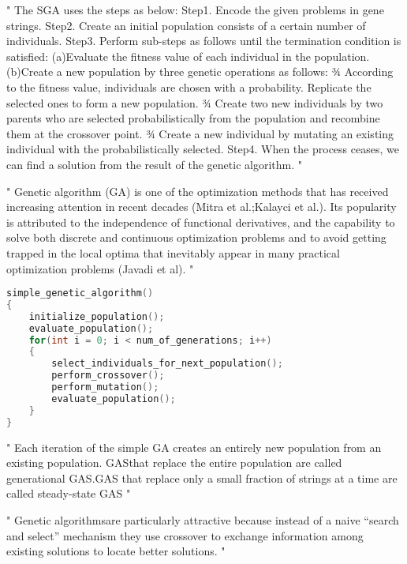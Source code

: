 "
The SGA uses the steps as below: Step1. Encode the given problems in gene strings. Step2. Create an initial population consists of a certain number of individuals. Step3. Perform sub-steps as follows until the termination condition is satisfied: (a)Evaluate the fitness value of each individual in the population. (b)Create a new population by three genetic operations as follows: ¾ According to the fitness value, individuals are chosen with a probability. Replicate the selected ones to form a new population. ¾ Create two new individuals by two parents who are selected probabilistically from the population and recombine them at the crossover point. ¾ Create a new individual by mutating an existing individual with the probabilistically selected. Step4. When the process ceases, we can find a solution from the result of the genetic algorithm.
"\cite{jinghui_zhong_comparison_2005}


"
Genetic algorithm (GA) is one of the optimization methods that has received increasing attention in recent decades (Mitra et al.;Kalayci et al.). Its popularity is attributed to the independence of functional derivatives, and the capability to solve both discrete and continuous optimization problems and to avoid getting trapped in the local optima that inevitably appear in many practical optimization problems (Javadi et al).
"


\begin{lstlisting}[language=C, tabsize=4]
simple_genetic_algorithm() 
{
	initialize_population();
	evaluate_population();
	for(int i = 0; i < num_of_generations; i++) 
	{
		select_individuals_for_next_population();
		perform_crossover();
		perform_mutation();
		evaluate_population();
	}
}
\end{lstlisting}
\cite{srinivas_genetic_1994}


"
Each iteration of the simple GA creates an entirely new population from an existing population. GASthat replace the entire population are called generational GAS.GAS that replace only a small fraction of strings at a time are called steady-state GAS
"\cite{srinivas_genetic_1994}

"
Genetic algorithmsare particularly attractive because instead of a naive “search and select” mechanism they use crossover to exchange information among existing solutions to locate better solutions.
"\cite{srinivas_genetic_1994}

